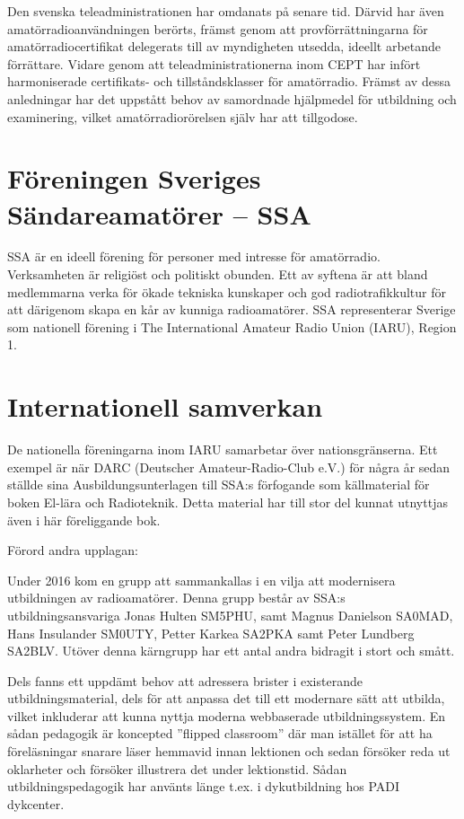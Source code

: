Den svenska teleadministrationen har omdanats på senare tid. Därvid har även
amatörradioanvändningen berörts, främst genom att provförrättningarna för
amatörradiocertifikat delegerats till av myndigheten utsedda, ideellt arbetande
förrättare. Vidare genom att teleadministrationerna inom CEPT har infört
harmoniserade certifikats- och tillståndsklasser för amatörradio. Främst av
dessa anledningar har det uppstått behov av samordnade hjälpmedel för utbildning
och examinering, vilket amatörradiorörelsen själv har att tillgodose.

\section*{Föreningen Sveriges Sändareamatörer -- SSA}

SSA är en ideell förening för personer med intresse för amatörradio.
Verksamheten är religiöst och politiskt obunden. Ett av syftena är att bland
medlemmarna verka för ökade tekniska kunskaper och god radiotrafikkultur för att
därigenom skapa en kår av kunniga radioamatörer. SSA representerar Sverige som
nationell förening i The International Amateur Radio Union (IARU), Region 1.

\section*{Internationell samverkan}

De nationella föreningarna inom IARU samarbetar över nationsgränserna. Ett
exempel är när DARC (Deutscher Amateur-Radio-Club e.V.) för några år sedan
ställde sina Ausbildungsunterlagen till SSA:s förfogande som källmaterial för
boken El-lära och Radioteknik. Detta material har till stor del kunnat utnyttjas
även i här föreliggande bok.


\clearpage

Förord andra upplagan:

Under 2016 kom en grupp att sammankallas i en vilja att modernisera
utbildningen av radioamatörer. Denna grupp består av SSA:s utbildningsansvariga
Jonas Hulten SM5PHU, samt Magnus Danielson SA0MAD, Hans Insulander SM0UTY,
Petter Karkea SA2PKA samt Peter Lundberg SA2BLV. Utöver denna kärngrupp har
ett antal andra bidragit i stort och smått.

Dels fanns ett uppdämt behov att adressera brister i existerande
utbildningsmaterial, dels för att anpassa det till ett modernare sätt att
utbilda, vilket inkluderar att kunna nyttja moderna webbaserade
utbildningssystem. En sådan pedagogik är koncepted ''flipped classroom''
där man istället för att ha föreläsningar snarare läser hemmavid innan
lektionen och sedan försöker reda ut oklarheter och försöker
illustrera det under lektionstid. Sådan utbildningspedagogik har använts länge
t.ex. i dykutbildning hos PADI dykcenter.

